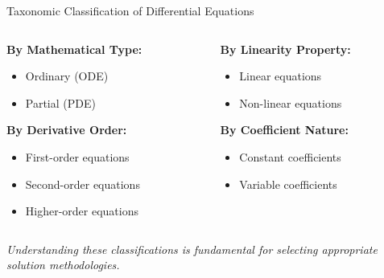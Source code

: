 \documentclass[10pt,aspectratio=169]{beamer}
\newcommand{\concept}[1]{\textcolor{mDarkTeal}{\textbf{#1}}}
\newcommand{\emphasis}[1]{\textit{#1}}
\begin{document}
\begin{frame}{Taxonomic Classification of Differential Equations}
    \begin{columns}
        \begin{column}{0.5\textwidth}
            \concept{By Mathematical Type:}
            \begin{itemize}
                \item Ordinary (ODE)
                \item Partial (PDE)
            \end{itemize}
            
            \vspace{0.3cm}
            
            \concept{By Derivative Order:}
            \begin{itemize}
                \item First-order equations
                \item Second-order equations
                \item Higher-order equations
            \end{itemize}
        \end{column}
        \begin{column}{0.5\textwidth}
            \concept{By Linearity Property:}
            \begin{itemize}
                \item Linear equations
                \item Non-linear equations
            \end{itemize}
            
            \vspace{0.3cm}
            
            \concept{By Coefficient Nature:}
            \begin{itemize}
                \item Constant coefficients
                \item Variable coefficients
            \end{itemize}
        \end{column}
    \end{columns}
    
    \vspace{0.3cm}
    
    \emphasis{Understanding these classifications is fundamental for selecting appropriate solution methodologies.}
\end{frame}
\end{document}
